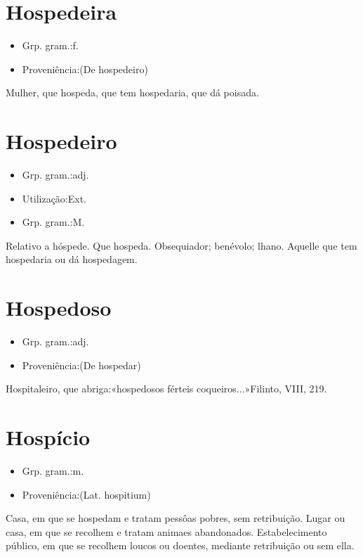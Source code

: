 \documentclass{article}
\begin{document}
\section{Hospedeira}
\begin{itemize}
\item {Grp. gram.:f.}
\end{itemize}
\begin{itemize}
\item {Proveniência:(De \textunderscore hospedeiro\textunderscore )}
\end{itemize}
Mulher, que hospeda, que tem hospedaria, que dá poisada.
\section{Hospedeiro}
\begin{itemize}
\item {Grp. gram.:adj.}
\end{itemize}
\begin{itemize}
\item {Utilização:Ext.}
\end{itemize}
\begin{itemize}
\item {Grp. gram.:M.}
\end{itemize}
Relativo a hóspede.
Que hospeda.
Obsequiador; benévolo; lhano.
Aquelle que tem hospedaria ou dá hospedagem.
\section{Hospedoso}
\begin{itemize}
\item {Grp. gram.:adj.}
\end{itemize}
\begin{itemize}
\item {Proveniência:(De \textunderscore hospedar\textunderscore )}
\end{itemize}
Hospitaleiro, que abriga:«\textunderscore hospedosos férteis coqueiros...\textunderscore »Filinto, VIII, 219.
\section{Hospício}
\begin{itemize}
\item {Grp. gram.:m.}
\end{itemize}
\begin{itemize}
\item {Proveniência:(Lat. \textunderscore hospitium\textunderscore )}
\end{itemize}
Casa, em que se hospedam e tratam pessôas pobres, sem retribuição.
Lugar ou casa, em que se recolhem e tratam animaes abandonados.
Estabelecimento público, em que se recolhem loucos ou doentes, mediante retribuição ou sem ella.
\end{document}
